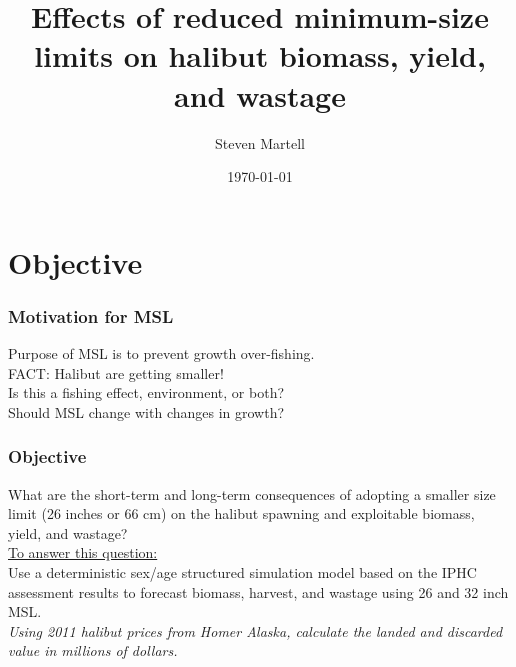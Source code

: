 \documentclass{beamer}
\title[\iscam]{Effects of reduced minimum-size limits on halibut biomass, yield, and wastage}
\author{Steven Martell}
\institute[UBC]
{
University of British Columbia \\
\medskip
{\emph{martell.steve@gmail.com}}
}
\date{\today}
\begin{document}
%
\begin{frame}
\titlepage
\end{frame}
%
\section{Objective} %
\label{sec:objective}


\begin{frame}
\frametitle{Motivation for MSL}

Purpose of MSL is to prevent growth over-fishing.\\
\bigskip
FACT:  Halibut are getting smaller!\\
\bigskip \pause
\alert{Is this a fishing effect, environment, or both?}\\
\bigskip
\alert{Should MSL change with changes in growth?}\\
\end{frame}
%
\begin{frame}[m]\frametitle{Objective}
	What are the short-term and long-term consequences of adopting a smaller size limit (26 inches or 66 cm) on the halibut spawning and exploitable biomass, yield, and wastage?\\
	\bigskip
\underline{To answer this question:}\\
Use a deterministic sex/age structured simulation model based on the IPHC assessment results to forecast biomass, harvest, and wastage using 26 and 32 inch MSL.\\
\medskip
\emph{Using 2011 halibut prices from Homer Alaska, calculate the landed and discarded value in millions of dollars.}\\
\end{frame}
%
\end{document}
